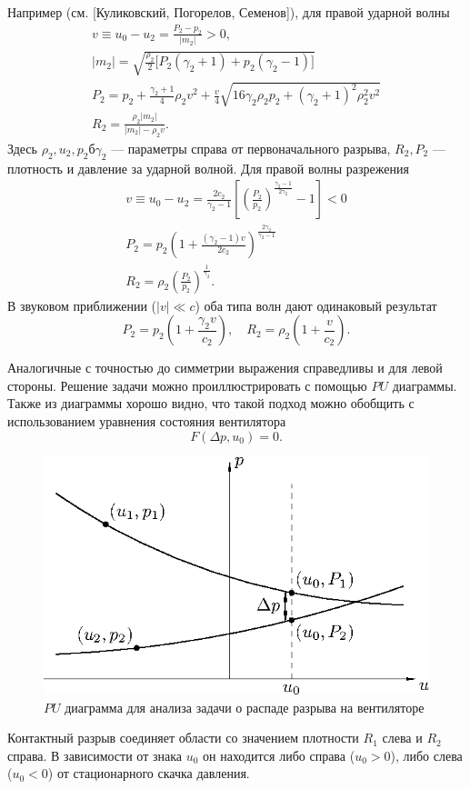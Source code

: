 \documentclass[12pt]{article}
\begin{document}
Например (см. [Куликовский, Погорелов, Семенов]), для правой ударной волны
\begin{gather*}
v \equiv u_0 - u_2 = \frac{P_2 - p_2}{|m_2|} > 0, \\
|m_2| = \sqrt{\frac{\rho_2}{2} \big[P_2 (\gamma_2 + 1) + p_2 (\gamma_2 - 1)\big]}\\
P_2 = p_2 + \frac{\gamma_2 + 1}{4} \rho_2 v^2 + \frac{v}{4}
\sqrt{16 \gamma_2 \rho_2 p_2 + (\gamma_2 + 1)^2 \rho_2^2 v^2}\\
R_2 = \frac{\rho_2 |m_2|}{|m_2| - \rho_2 v}
.
\end{gather*}
Здесь $\rho_2, u_2, p_2б \gamma_2$ --- параметры справа от первоначального разрыва, $R_2, P_2$ --- плотность и давление за ударной волной.
Для правой волны разрежения
\begin{gather*}
v \equiv u_0 - u_2 = \frac{2c_2}{\gamma_2 - 1} \left[\left(\frac{P_2}{p_2}\right)^{\frac{\gamma_2 - 1}{2\gamma_2}}-1\right] < 0\\
P_2 = p_2 \left(1 + \frac{(\gamma_2 - 1)v}{2c_2}\right)^\frac{2\gamma_2}{\gamma_2 - 1}\\
R_2 = \rho_2 \left(\frac{P_2}{p_2}\right)^{\frac{1}{\gamma_2}}.
\end{gather*}
В звуковом приближении ($|v| \ll c$) оба типа волн дают одинаковый результат
\[
P_2 = p_2 \left(1 + \frac{\gamma_2 v}{c_2}\right), \quad
R_2 = \rho_2 \left(1 + \frac{v}{c_2}\right).
\]

Аналогичные с точностью до симметрии выражения справедливы и для левой стороны. Решение задачи можно проиллюстрировать с помощью $PU$ диаграммы. Также из диаграммы хорошо видно, что такой подход можно обобщить с использованием уравнения состояния вентилятора 
\[
F(\Delta p, u_0) = 0.
\]
\begin{figure}
\centering
\includegraphics[width=.8\columnwidth]{conf-4.eps}
\caption{$PU$ диаграмма для анализа задачи о распаде разрыва на вентиляторе}
\end{figure}
Контактный разрыв соединяет области со значением плотности $R_1$ слева и $R_2$ справа. В зависимости от знака $u_0$ он находится либо справа ($u_0 > 0$), либо слева ($u_0 < 0$) от стационарного скачка давления.
\end{document}
